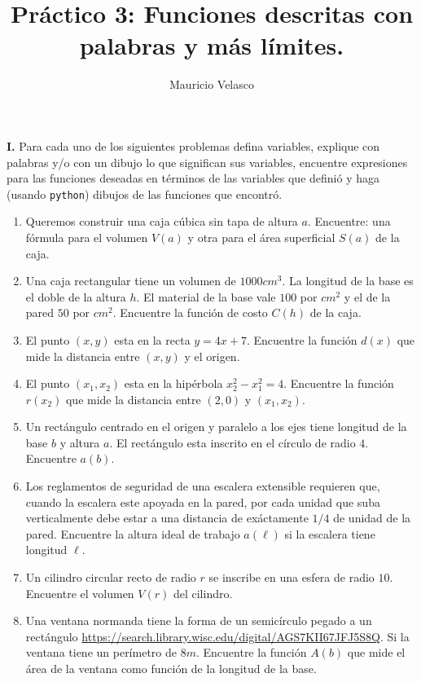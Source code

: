 \documentclass[12pt, a4paper]{article}
\date{}
\begin{document}
\title{Pr\'actico 3: Funciones descritas con palabras y más límites.}
\author{Mauricio Velasco}
\maketitle{}
{\bf I.} Para cada uno de los siguientes problemas defina variables, explique con palabras y/o con un dibujo lo que significan sus variables, encuentre expresiones para las funciones deseadas en términos de las variables que definió y haga (usando \verb!python!) dibujos de las funciones que encontró.\\
\begin{enumerate} 
\item Queremos construir una caja cúbica sin tapa de altura $a$. Encuentre: una fórmula para el volumen $V(a)$ y otra para el área superficial $S(a)$ de la caja.

\item Una caja rectangular tiene un volumen de $1000cm^3$. La longitud de la base es el doble de la altura $h$. El material de la base vale $100$ por $cm^2$ y el de la pared $50$ por $cm^2$. Encuentre la función de costo $C(h)$ de la caja.

\item El punto $(x,y)$ esta en la recta $y=4x+7$. Encuentre la función $d(x)$ que mide la distancia entre $(x,y)$ y el origen.

\item El punto $(x_1,x_2)$ esta en la hipérbola $x_2^2-x_1^2=4$. Encuentre la función $r(x_2)$ que mide la distancia entre $(2,0)$ y $(x_1,x_2)$.

\item Un rectángulo centrado en el origen y paralelo a los ejes tiene longitud de la base $b$ y altura $a$. El rectángulo esta inscrito en el círculo de radio $4$. Encuentre $a(b)$. 

\item Los reglamentos de seguridad de una escalera extensible requieren que, cuando la escalera este apoyada en la pared, por cada unidad que suba verticalmente debe estar a una distancia de exáctamente $1/4$ de unidad de la pared.  Encuentre la altura ideal de trabajo $a(\ell)$ si la escalera tiene longitud $\ell$.

\item Un cilindro circular recto de radio $r$ se inscribe en una esfera de radio $10$. Encuentre el volumen $V(r)$ del cilindro.

\item Una ventana normanda tiene la forma de un semicírculo pegado a un rectángulo \url{https://search.library.wisc.edu/digital/AGS7KII67JFJ5S8Q}. Si la ventana tiene un perímetro de $8m$. Encuentre la función $A(b)$ que mide el área de la ventana como función de la longitud de la base.


\end{enumerate}
\end{document}
